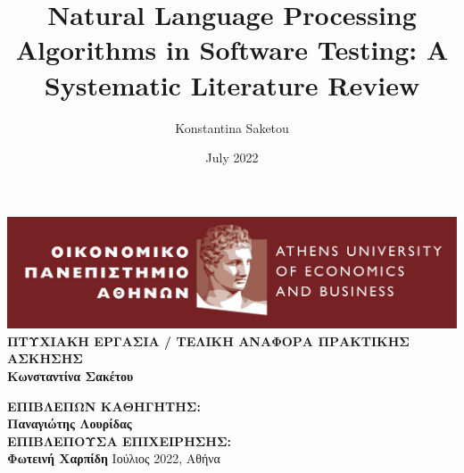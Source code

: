 \documentclass[11pt]{report}
\title{Natural Language Processing Algorithms in Software Testing: A Systematic Literature Review}
\author{Konstantina Saketou}
\date{July 2022}
\begin{document}
  \begin{titlepage}
    \centering
    \includegraphics[width=17cm]{images/aueb_logo.jpg}
    \vfill
    {\bfseries\Large
        ΠΤΥΧΙΑΚΗ ΕΡΓΑΣΙΑ / ΤΕΛΙΚΗ ΑΝΑΦΟΡΑ ΠΡΑΚΤΙΚΗΣ ΑΣΚΗΣΗΣ\\
        \vskip1cm
        Κωνσταντίνα Σακέτου\\
    }       
      
    
    \vfill{\bfseries\Large  
      ΕΠΙΒΛΕΠΩΝ ΚΑΘΗΓΗΤΗΣ:\\
      Παναγιώτης Λουρίδας\\ 
      \vskip1cm
      ΕΠΙΒΛΕΠΟΥΣΑ ΕΠΙΧΕΙΡΗΣΗΣ:\\
      Φωτεινή Χαρπίδη
    } 
    \vfill{\normalsize Ιούλιος 2022, Αθήνα}
  \end{titlepage}


\nocite{*}




\end{document}
